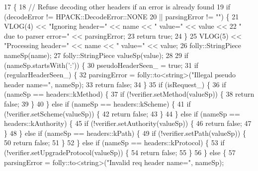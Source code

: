 \begin{DoxyCode}
17                                                             \{
18   \textcolor{comment}{// Refuse decoding other headers if an error is already found}
19   \textcolor{keywordflow}{if} (decodeError != HPACK::DecodeError::NONE
20       || parsingError != \textcolor{stringliteral}{""}) \{
21     VLOG(4) << \textcolor{stringliteral}{"Ignoring header="} << name << \textcolor{stringliteral}{" value="} << value <<
22       \textcolor{stringliteral}{" due to parser error="} << parsingError;
23     \textcolor{keywordflow}{return} \textcolor{keyword}{true};
24   \}
25   VLOG(5) << \textcolor{stringliteral}{"Processing header="} << name << \textcolor{stringliteral}{" value="} << value;
26   folly::StringPiece nameSp(name);
27   folly::StringPiece valueSp(value);
28 
29   \textcolor{keywordflow}{if} (nameSp.startsWith(\textcolor{charliteral}{':'})) \{
30     pseudoHeaderSeen_ = \textcolor{keyword}{true};
31     \textcolor{keywordflow}{if} (regularHeaderSeen_) \{
32       parsingError = folly::to<string>(\textcolor{stringliteral}{"Illegal pseudo header name="}, nameSp);
33       \textcolor{keywordflow}{return} \textcolor{keyword}{false};
34     \}
35     \textcolor{keywordflow}{if} (isRequest_) \{
36       \textcolor{keywordflow}{if} (nameSp == headers::kMethod) \{
37         \textcolor{keywordflow}{if} (!verifier.setMethod(valueSp)) \{
38           \textcolor{keywordflow}{return} \textcolor{keyword}{false};
39         \}
40       \} \textcolor{keywordflow}{else} \textcolor{keywordflow}{if} (nameSp == headers::kScheme) \{
41         \textcolor{keywordflow}{if} (!verifier.setScheme(valueSp)) \{
42           \textcolor{keywordflow}{return} \textcolor{keyword}{false};
43         \}
44       \} \textcolor{keywordflow}{else} \textcolor{keywordflow}{if} (nameSp == headers::kAuthority) \{
45         \textcolor{keywordflow}{if} (!verifier.setAuthority(valueSp)) \{
46           \textcolor{keywordflow}{return} \textcolor{keyword}{false};
47         \}
48       \} \textcolor{keywordflow}{else} \textcolor{keywordflow}{if} (nameSp == headers::kPath) \{
49         \textcolor{keywordflow}{if} (!verifier.setPath(valueSp)) \{
50           \textcolor{keywordflow}{return} \textcolor{keyword}{false};
51         \}
52       \} \textcolor{keywordflow}{else} \textcolor{keywordflow}{if} (nameSp == headers::kProtocol) \{
53         \textcolor{keywordflow}{if} (!verifier.setUpgradeProtocol(valueSp)) \{
54           \textcolor{keywordflow}{return} \textcolor{keyword}{false};
55         \}
56       \} \textcolor{keywordflow}{else} \{
57         parsingError = folly::to<string>(\textcolor{stringliteral}{"Invalid req header name="}, nameSp);

\end{DoxyCode}
